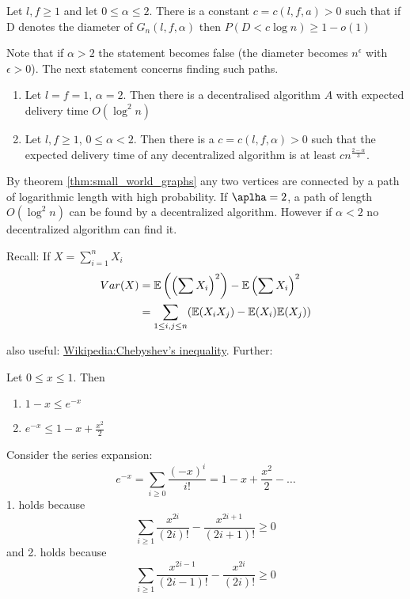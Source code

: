 \begin{thm}\label{thm:small_world_graphs} Let $l,f\geq 1$ and let $0\leq \alpha \leq 2$. There is a constant $c=c(l,f,a) > 0$ such that if D denotes the diameter of $G_n(l,f,\alpha)$ then $P(D<c\log n) \geq 1-o(1)$
\end{thm}

Note that if $\alpha > 2$ the statement becomes false (the diameter becomes $n^\epsilon$ with $\epsilon > 0$). The next statement concerns finding such paths.

\begin{thm}\label{thm:finding_short_paths} \mbox{}\begin{enumerate}
\item Let $l=f=1$, $\alpha =2$. Then there is a decentralised algorithm $A$ with expected delivery time $O(\log^2n)$
\item Let $l,f\geq 1$, $0 \leq \alpha < 2$. Then there is a $c=c(l,f,\alpha)>0$ such that the expected delivery time of any decentralized algorithm is at least $c n^{\frac{2-\alpha}{3}}$.
\end{enumerate}
\end{thm}

By theorem \ref{thm:small_world_graphs} any two vertices are connected by a path of logarithmic length with high probability. If $\aplha=2$, a path of length $O(\log ^2 n)$ can be found by a decentralized algorithm. However if $\alpha <2$ no decentralized algorithm can find it.

Recall: If $X = \sum_{i=1}^n X_i$
\begin{align*}
Var(X) &= \mathbb{E}\left(\left(\sum X_i\right)^2\right) - \mathbb{E}\left(\sum X_i\right)^2\\
	&= \sum_{1\leq i, j\leq n} (\mathbb{E}(X_iX_j) - \mathbb{E}(X_i)\mathbb{E}(X_j))
\end{align*}

also useful: \href{http://en.wikipedia.org/wiki/Chebyshev\%27s_inequality}{Wikipedia:Chebyshev's inequality}. Further:

\begin{lem} Let $0\leq x \leq 1$. Then
\begin{enumerate}
\item $1-x\leq e^{-x}$
\item $e^{-x} \leq 1-x+\frac{x^2}{2}$
\end{enumerate}
\end{lem}
\begin{pr} Consider the series expansion:
\[e^{-x} = \sum_{i\geq 0} \frac{(-x)^i}{i!} = 1-x+\frac{x^2}{2} - \ldots\]
1. holds because 
\[\sum_{i\geq 1} \frac{x^{2i}}{(2i)!} - \frac{x^{2i+1}}{(2i+1)!} \geq 0\]
and 2. holds because
\[\sum_{i\geq 1} \frac{x^{2i-1}}{(2i-1)!} - \frac{x^{2i}}{(2i)!} \geq 0\]
\end{pr}

